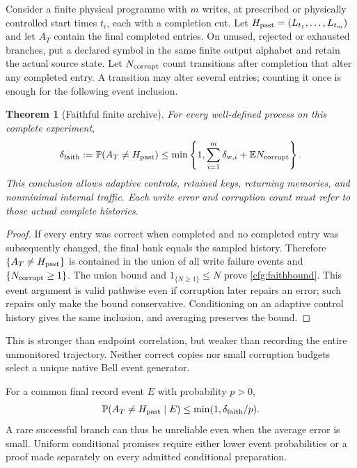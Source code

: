 \documentclass[11pt,oneside,openany]{book}
\newtheorem{theorem}{Theorem}[chapter]
\theoremstyle{definition}
\theoremstyle{remark}\newtheorem{remark}[theorem]{Remark}
\begin{document}
Consider a finite physical programme with $m$ writes, at prescribed or
physically controlled start times $t_i$, each with a completion cut.
Let $H_{\rm past}=(L_{t_1},\ldots,L_{t_m})$ and let $A_T$ contain
the final completed entries. On unused, rejected or exhausted branches,
put a declared symbol in the same finite output alphabet and retain the
actual source state. Let $N_{\rm corrupt}$ count transitions after completion
that alter any completed entry. A transition may alter several entries;
counting it once is enough for the following event inclusion.

\begin{theorem}[Faithful finite archive]\label{cfg:faithful}
For every well-defined process on this complete experiment,
\begin{equation}
 \delta_{\rm faith}:=\mathbb P(A_T\ne H_{\rm past})
 \le\min\left\{1,\sum_{i=1}^m\delta_{{\rm w},i}
                         +\mathbb E N_{\rm corrupt}\right\}.
 \label{cfg:faithbound}
\end{equation}
This conclusion allows adaptive controls, retained keys, returning memories,
and nonminimal internal traffic. Each write error and corruption count must
refer to those actual complete histories.
\end{theorem}
\begin{proof}
If every entry was correct when completed and no completed entry was
subsequently changed, the final bank equals the sampled history.
Therefore $\{A_T\ne H_{\rm past}\}$ is contained in the union of all write
failure events and $\{N_{\rm corrupt}\ge1\}$. The union bound and
$1_{\{N\ge1\}}\le N$ prove \eqref{cfg:faithbound}. This event argument is
valid pathwise even if corruption later repairs an error; such repairs only
make the bound conservative. Conditioning on an adaptive control history
gives the same inclusion, and averaging preserves the bound.
\end{proof}

This is stronger than endpoint correlation, but weaker than recording the
entire unmonitored trajectory. Neither correct copies nor small corruption
budgets select a unique native Bell event generator.

For a common final record event $E$ with probability $p>0$,
\[
 \mathbb P(A_T\ne H_{\rm past}\mid E)
       \le\min(1,\delta_{\rm faith}/p).
\]
A rare successful branch can thus be unreliable even when the average
error is small. Uniform conditional promises require either lower event
probabilities or a proof made separately on every admitted conditional
preparation.
\end{document}
